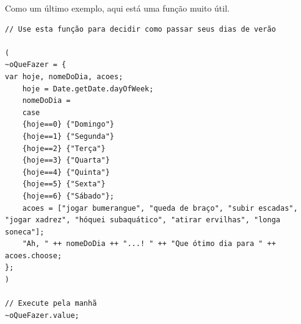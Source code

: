 Como um último exemplo, aqui está uma função muito útil.
 
\begin{lstlisting}[style=SuperCollider-IDE, basicstyle=\scttfamily\footnotesize]
// Use esta função para decidir como passar seus dias de verão

(
~oQueFazer = { 
var hoje, nomeDoDia, acoes;
	hoje = Date.getDate.dayOfWeek;
	nomeDoDia = 
	case
	{hoje==0} {"Domingo"}
	{hoje==1} {"Segunda"}
	{hoje==2} {"Terça"}
	{hoje==3} {"Quarta"}
	{hoje==4} {"Quinta"}
	{hoje==5} {"Sexta"}
	{hoje==6} {"Sábado"};
	acoes = ["jogar bumerangue", "queda de braço", "subir escadas", "jogar xadrez", "hóquei subaquático", "atirar ervilhas", "longa soneca"];
	"Ah, " ++ nomeDoDia ++ "...! " ++ "Que ótimo dia para " ++ acoes.choose;
};
)

// Execute pela manhã
~oQueFazer.value;
\end{lstlisting}

\bigskip
{} 

